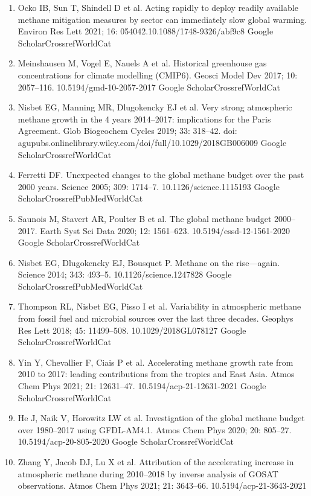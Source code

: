 \documentclass[a4paper,12pt]{article}
\begin{document}
{\begin{thebibliography}{}
\begin{enumerate}
    \item	Ocko IB, Sun T, Shindell D et al.  Acting rapidly to deploy readily available methane mitigation measures by sector can immediately slow global warming. Environ Res Lett 2021; 16: 054042.10.1088/1748-9326/abf9c8
    Google ScholarCrossrefWorldCat 
    \item	Meinshausen M, Vogel E, Nauels A et al.  Historical greenhouse gas concentrations for climate modelling (CMIP6). Geosci Model Dev 2017; 10: 2057–116. 10.5194/gmd-10-2057-2017
    Google ScholarCrossrefWorldCat 
    \item	Nisbet EG, Manning MR, Dlugokencky EJ et al.  Very strong atmospheric methane growth in the 4 years 2014–2017: implications for the Paris Agreement. Glob Biogeochem Cycles 2019; 33: 318–42. doi: agupubs.onlinelibrary.wiley.com/doi/full/10.1029/2018GB006009
    Google ScholarCrossrefWorldCat 
    \item	Ferretti DF. Unexpected changes to the global methane budget over the past 2000 years. Science 2005; 309: 1714–7. 10.1126/science.1115193
    Google ScholarCrossrefPubMedWorldCat 
    \item	Saunois M, Stavert AR, Poulter B et al.  The global methane budget 2000–2017. Earth Syst Sci Data 2020; 12: 1561–623. 10.5194/essd-12-1561-2020
    Google ScholarCrossrefWorldCat 
    \item	Nisbet EG, Dlugokencky EJ, Bousquet P. Methane on the rise—again. Science 2014; 343: 493–5. 10.1126/science.1247828
    Google ScholarCrossrefPubMedWorldCat 
    \item	Thompson RL, Nisbet EG, Pisso I et al.  Variability in atmospheric methane from fossil fuel and microbial sources over the last three decades. Geophys Res Lett 2018; 45: 11499–508. 10.1029/2018GL078127
    Google ScholarCrossrefWorldCat 
    \item	Yin Y, Chevallier F, Ciais P et al.  Accelerating methane growth rate from 2010 to 2017: leading contributions from the tropics and East Asia. Atmos Chem Phys 2021; 21: 12631–47. 10.5194/acp-21-12631-2021
    Google ScholarCrossrefWorldCat 
    \item	He J, Naik V, Horowitz LW et al.  Investigation of the global methane budget over 1980–2017 using GFDL-AM4.1. Atmos Chem Phys 2020; 20: 805–27. 10.5194/acp-20-805-2020
    Google ScholarCrossrefWorldCat 
    \item	Zhang Y, Jacob DJ, Lu X et al.  Attribution of the accelerating increase in atmospheric methane during 2010–2018 by inverse analysis of GOSAT observations. Atmos Chem Phys 2021; 21: 3643–66. 10.5194/acp-21-3643-2021

\end{enumerate}
\end{thebibliography}}
\end{document}
